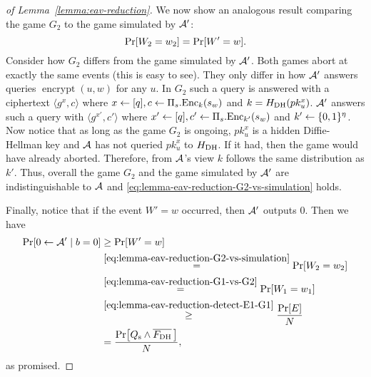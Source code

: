 \begin{proof}[of Lemma~\ref{lemma:eav-reduction}]
	We now show an analogous result comparing the game $G_2$ to the game simulated by $\mathcal{A}'$:
	\begin{equation} \label{eq:lemma-eav-reduction-G2-vs-simulation}
		\pr{W_2 = w_2} = \pr{W' = w}.
	\end{equation}
	Consider how $G_2$ differs from the game simulated by $\mathcal{A}'$. Both games abort at exactly the same events (this is easy to see). They only differ in how $\mathcal{A}'$ answers queries $\operatorname{encrypt}(u, w)$ for any $u$. In $G_2$ such a query is answered with a ciphertext $\langle g^x, c \rangle$ where $x \leftarrow [q], c \leftarrow \Pi_s.\mathrm{Enc}_k(s_w)$ and $k = H_\mathrm{DH}(pk_u^x)$. $\mathcal{A}'$ answers such a query with $\langle g^{x'}, c' \rangle$ where $x' \leftarrow [q], c' \leftarrow \Pi_s.\mathrm{Enc}_{k'}(s_w)$ and $k' \leftarrow \{0, 1\}^\eta$. Now notice that as long as the game $G_2$ is ongoing, $pk_u^{x}$ is a hidden Diffie-Hellman key and $\mathcal{A}$ has not queried $pk_u^{x}$ to $H_\mathrm{DH}$. If it had, then the game would have already aborted. Therefore, from $\mathcal{A}$'s view $k$ follows the same distribution as $k'$. Thus, overall the game $G_2$ and the game simulated by $\mathcal{A}'$ are indistinguishable to $\mathcal{A}$ and \eqref{eq:lemma-eav-reduction-G2-vs-simulation} holds.

	Finally, notice that if the event $W' = w$ occurred, then $\mathcal{A}'$ outputs $0$. Then we have
	\begin{align*}
		\pr{0 \from \adv' \mid b = 0} & \ge \pr{W' = w}                                                              \\
		                              & \stackrel{\eqref{eq:lemma-eav-reduction-G2-vs-simulation}}{=} \pr{W_2 = w_2} \\
		                              & \stackrel{\eqref{eq:lemma-eav-reduction-G1-vs-G2}}{=}  \pr{W_1 = w_1}        \\
		                              & \stackrel{\eqref{eq:lemma-eav-reduction-detect-E1-G1}}{\ge} \frac{\pr{E}}{N} \\
		                              & = \frac{\pr{\qs \land \overline{\fdh}\,}}{N},
	\end{align*}
	as promised.


\end{proof}
